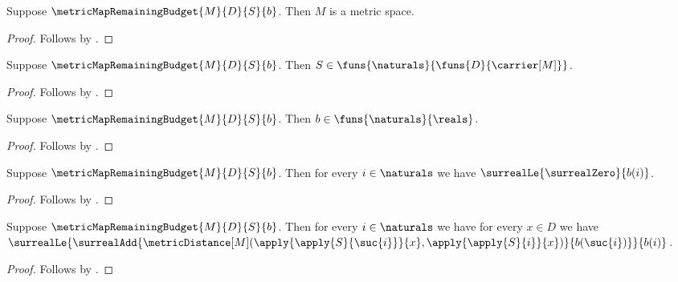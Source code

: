 \begin{proposition}\label{metric_map_remaining_budget_metric_space}
    Suppose $\metricMapRemainingBudget{M}{D}{S}{b}$.
    Then $M$ is a metric space.
\end{proposition}
\begin{proof}
    Follows by .
\end{proof}

\begin{proposition}\label{metric_map_remaining_budget_map_sequence}
    Suppose $\metricMapRemainingBudget{M}{D}{S}{b}$.
    Then $S\in\funs{\naturals}{\funs{D}{\carrier[M]}}$.
\end{proposition}
\begin{proof}
    Follows by .
\end{proof}

\begin{proposition}\label{metric_map_remaining_budget_real_sequence}
    Suppose $\metricMapRemainingBudget{M}{D}{S}{b}$.
    Then $b\in\funs{\naturals}{\reals}$.
\end{proposition}
\begin{proof}
    Follows by .
\end{proof}

\begin{proposition}\label{metric_map_remaining_budget_nonnegative}
    Suppose $\metricMapRemainingBudget{M}{D}{S}{b}$.
    Then for every $i\in\naturals$ we have
        $\surrealLe{\surrealZero}{b(i)}$.
\end{proposition}
\begin{proof}
    Follows by .
\end{proof}

\begin{proposition}\label{metric_map_remaining_budget_spending}
    Suppose $\metricMapRemainingBudget{M}{D}{S}{b}$.
    Then for every $i\in\naturals$ we have for every $x\in D$ we have
        $\surrealLe{
            \surrealAdd{
                \metricDistance[M]
                    (\apply{\apply{S}{\suc{i}}}{x},
                     \apply{\apply{S}{i}}{x})}
                {b(\suc{i})}}
            {b(i)}$.
\end{proposition}
\begin{proof}
    Follows by .
\end{proof}

